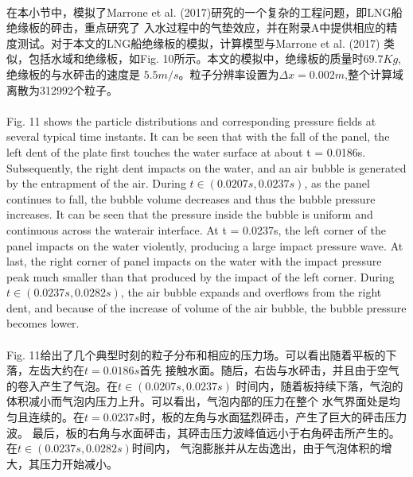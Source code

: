 \documentclass[UTF8]{ctexart}
\begin{document}
\paragraph{\quad}在本小节中，模拟了Marrone et al. (2017)研究的一个复杂的工程问题，即LNG船绝缘板的砰击，重点研究了
                入水过程中的气垫效应，并在附录A中提供相应的精度测试。对于本文的LNG船绝缘板的模拟，计算模型与Marrone et al. (2017)
                类似，包括水域和绝缘板，如Fig. 10所示。本文的模拟中，绝缘板的质量时$69.7Kg$,绝缘板的与水砰击的速度是
                $5.5m/s$。粒子分辨率设置为$\Delta x = 0.002m$,整个计算域离散为312992个粒子。

\paragraph{\quad}Fig. 11 shows the particle distributions and corresponding pressure 
                fields at several typical time instants. It can be seen that with the 
                fall of the panel, the left dent of the plate first touches the water 
                surface at about t = 0.0186s. Subsequently, the right dent impacts on 
                the water, and an air bubble is generated by the entrapment of the air. 
                During $t \in (0.0207s, 0.0237s)$, as the panel continues to fall, the bubble 
                volume decreases and thus the bubble pressure increases. It can be seen 
                that the pressure inside the bubble is uniform and continuous across the 
                waterair interface. At t = 0.0237s, the left corner of the panel impacts 
                on the water violently, producing a large impact pressure wave. At last, 
                the right corner of panel impacts on the water with the impact pressure 
                peak much smaller than that produced by the impact of the left corner. 
                During $t \in (0.0237s, 0.0282s)$, the air bubble expands and overflows from 
                the right dent, and because of the increase of volume of the air bubble, 
                the bubble pressure becomes lower.
\paragraph{\quad}Fig. 11给出了几个典型时刻的粒子分布和相应的压力场。可以看出随着平板的下落，左齿大约在$t=0.0186s$首先
                接触水面。随后，右齿与水砰击，并且由于空气的卷入产生了气泡。在$t \in (0.0207s,0.0237s)$
                时间内，随着板持续下落，气泡的体积减小而气泡内压力上升。可以看出，气泡内部的压力在整个
                水气界面处是均匀且连续的。在$t=0.0237s$时，板的左角与水面猛烈砰击，产生了巨大的砰击压力波。
                最后，板的右角与水面砰击，其砰击压力波峰值远小于右角砰击所产生的。在$t \in (0.0237s,0.0282s)$时间内，
                气泡膨胀并从左齿逸出，由于气泡体积的增大，其压力开始减小。
\end{document}
